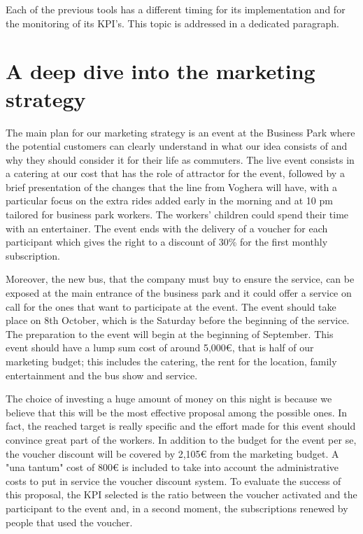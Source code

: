 

Each of the previous tools has a different timing for its implementation and for the monitoring of its KPI’s. This topic is addressed in a dedicated paragraph.
\section{A deep dive into the marketing strategy}
The main plan for our marketing strategy is an event at the Business Park where the potential customers can clearly understand in what our idea consists of and why they should consider it for their life as commuters. The live event consists in a catering at our cost that has the role of attractor for the event, followed by a brief presentation of the changes that the line from Voghera will have, with a particular focus on the extra rides added early in the morning and at 10 pm tailored for business park workers. The workers’ children could spend their time with an entertainer. The event ends with the delivery of a voucher for each participant which gives the right to a discount of 30\% for the first monthly subscription.

Moreover, the new bus, that the company must buy to ensure the service, can be exposed at the main entrance of the business park and it could offer a service on call for the ones that want to participate at the event. The event should take place on 8th October, which is the Saturday before the beginning of the service. The preparation to the event will begin at the beginning of September. This event should have a lump sum cost of around 5,000€, that is half of our marketing budget; this includes the catering, the rent for the location, family entertainment and the bus show and service.

The choice of investing a huge amount of money on this night is because we believe that this will be the most effective proposal among the possible ones. In fact, the reached target is really specific and the effort made for this event should convince great part of the workers. In addition to the budget for the event per se, the voucher discount will be covered by 2,105€ from the marketing budget. A "una tantum" cost of 800€ is included to take into account the administrative costs to put in service the voucher discount system. To evaluate the success of this proposal, the KPI selected is the ratio between the voucher activated and the participant to the event and, in a second moment, the subscriptions renewed by people that used the voucher. 

